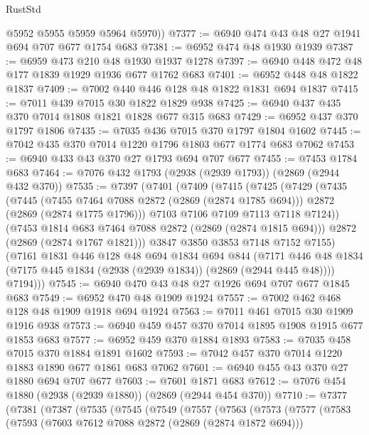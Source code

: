 \begin{lexlean}{RustStd}
\begin{coremodule}
        @5952
        @5955
        @5959
        @5964
        @5970))
@7377 := @6940 @474 @43 @48 @27 @1941 @694 @707 @677 @1754 @683
@7381 := @6952 @474 @48 @1930 @1939
@7387 := @6959 @473 @210 @48 @1930 @1937 @1278
@7397 := @6940 @448 @472 @48 @177 @1839 @1929 @1936 @677 @1762 @683
@7401 := @6952 @448 @48 @1822 @1837
@7409 := @7002 @440 @446 @128 @48 @1822 @1831 @694 @1837
@7415 := @7011 @439 @7015 @30 @1822 @1829 @938
@7425 := @6940 @437 @435 @370 @7014 @1808 @1821 @1828 @677 @315 @683
@7429 := @6952 @437 @370 @1797 @1806
@7435 := @7035 @436 @7015 @370 @1797 @1804 @1602
@7445 := @7042 @435 @370 @7014 @1220 @1796 @1803 @677 @1774 @683 @7062
@7453 := @6940 @433 @43 @370 @27 @1793 @694 @707 @677
@7455 := @7453 @1784 @683
@7464 := @7076 @432 @1793 (@2938 (@2939 @1793)) (@2869 (@2944 @432 @370))
@7535 := @7397
    (@7401
      (@7409
        (@7415
          (@7425
            (@7429
              (@7435
                (@7445
                  (@7455 @7464 @7088 @2872 (@2869 (@2874 @1785 @694)))
                  @2872
                  (@2869 (@2874 @1775 @1796)))
                @7103
                @7106
                @7109
                @7113
                @7118
                @7124))
            (@7453 @1814 @683 @7464 @7088 @2872 (@2869 (@2874 @1815 @694)))
            @2872
            (@2869 (@2874 @1767 @1821)))
          @3847
          @3850
          @3853
          @7148
          @7152
          @7155)
        (@7161
          @1831
          @446
          @128
          @48
          @694
          @1834
          @694
          @844
          (@7171 @446 @48 @1834 (@7175 @445 @1834 (@2938 (@2939 @1834)) (@2869 (@2944 @445 @48))))
          @7194)))
@7545 := @6940 @470 @43 @48 @27 @1926 @694 @707 @677 @1845 @683
@7549 := @6952 @470 @48 @1909 @1924
@7557 := @7002 @462 @468 @128 @48 @1909 @1918 @694 @1924
@7563 := @7011 @461 @7015 @30 @1909 @1916 @938
@7573 := @6940 @459 @457 @370 @7014 @1895 @1908 @1915 @677 @1853 @683
@7577 := @6952 @459 @370 @1884 @1893
@7583 := @7035 @458 @7015 @370 @1884 @1891 @1602
@7593 := @7042 @457 @370 @7014 @1220 @1883 @1890 @677 @1861 @683 @7062
@7601 := @6940 @455 @43 @370 @27 @1880 @694 @707 @677
@7603 := @7601 @1871 @683
@7612 := @7076 @454 @1880 (@2938 (@2939 @1880)) (@2869 (@2944 @454 @370))
@7710 := @7377
    (@7381
      (@7387
        (@7535
          (@7545
            (@7549
              (@7557
                (@7563
                  (@7573
                    (@7577
                      (@7583
                        (@7593
                          (@7603 @7612 @7088 @2872 (@2869 (@2874 @1872 @694)))

\end{coremodule}
\end{lexlean}

